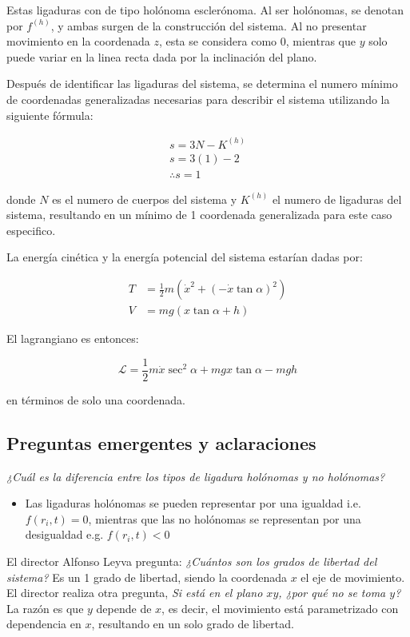 \documentclass{article}
\theoremstyle{definition}
\begin{document}
Estas ligaduras con de tipo holónoma esclerónoma. Al ser holónomas, se denotan por $f^{(h)}$, y ambas surgen de la construcción del sistema. Al no presentar movimiento en la coordenada $z$, esta se considera como $0$, mientras que $y$ solo puede variar en la linea recta dada por la inclinación del plano.

Después de identificar las ligaduras del sistema, se determina el numero mínimo de coordenadas generalizadas necesarias para describir el sistema utilizando la siguiente fórmula:

\begin{gather}
	s = 3N - K^{(h)} \label{eq:minim_coordinates}\\
	s = 3(1) - 2 \\
	\therefore s = 1
\end{gather}

donde $N$ es el numero de cuerpos del sistema y $K^{(h)}$ el numero de ligaduras del sistema, resultando en un mínimo de 1 coordenada generalizada para este caso especifico.

La energía cinética y la energía potencial del sistema estarían dadas por:

\begin{align}
	T &= \frac{1}{2} m \left(\dot{x}^2 + (-\dot{x}\tan{\alpha})^2 \right) \\
	V &= mg\left(x\tan{\alpha} + h \right)
\end{align}

El lagrangiano es entonces:

\begin{equation}
	\mathcal{L} = \frac{1}{2}m\dot{x}\sec^2{\alpha} + mgx\tan{\alpha} - mgh
\end{equation}

en términos de solo una coordenada.

\subsection{Preguntas emergentes y aclaraciones}
\emph{¿Cuál es la diferencia entre los tipos de ligadura holónomas y no holónomas?}
\begin{itemize}
	\item Las ligaduras holónomas se pueden representar por una igualdad i.e. $f(r_i, t) = 0$, mientras que las no holónomas se representan por una desigualdad e.g. $f(r_i, t) < 0$
\end{itemize}

	El director Alfonso Leyva pregunta: \emph{¿Cuántos son los grados de libertad del sistema?} Es un 1 grado de libertad, siendo la coordenada $x$ el eje de movimiento. El director realiza otra pregunta, \emph{Si está en el plano $xy$, ¿por qué no se toma $y$?} La razón es que $y$ depende de $x$, es decir, el movimiento está parametrizado con dependencia en $x$, resultando en un solo grado de libertad.
\end{document}
